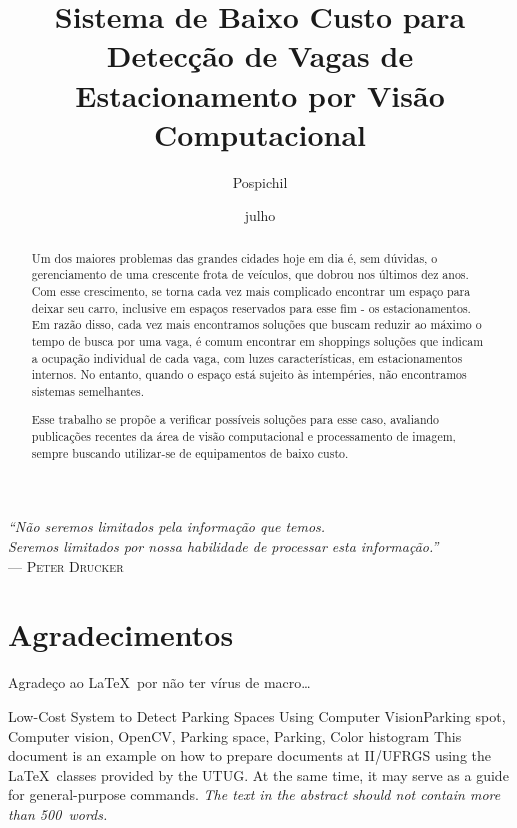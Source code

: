 \documentclass[ecp,tc]{iiufrgs}
\title{Sistema de Baixo Custo para Detecção de Vagas de Estacionamento por Visão Computacional}
\author{Pospichil}{Bruno Meybom}
\date{julho}{2015}
\begin{document}
\maketitle

\clearpage
\begin{flushright}
\mbox{}\vfill
{\sffamily\itshape
``Não seremos limitados pela informação que temos.\\
Seremos limitados por nossa habilidade de processar esta informação.''\\}
--- \textsc{Peter Drucker}
\end{flushright}

\chapter*{Agradecimentos}
Agradeço ao \LaTeX\ por não ter vírus de macro\ldots



\begin{abstract}
Um dos maiores problemas das grandes cidades hoje em dia é, sem dúvidas, o gerenciamento de uma crescente frota de veículos, que dobrou nos últimos dez anos. Com esse crescimento, se torna cada vez mais complicado encontrar um espaço para deixar seu carro, inclusive em espaços reservados para esse fim - os estacionamentos. Em razão disso, cada vez mais encontramos soluções que buscam reduzir ao máximo o tempo de busca por uma vaga, é comum encontrar em shoppings soluções que indicam a ocupação individual de cada vaga, com luzes características, em estacionamentos internos. No entanto, quando o espaço está sujeito às intempéries, não encontramos sistemas semelhantes.

Esse trabalho se propõe a verificar possíveis soluções para esse caso, avaliando publicações recentes da área de visão computacional e processamento de imagem, sempre buscando utilizar-se de equipamentos de baixo custo.
\end{abstract}

\begin{englishabstract}{Low-Cost System to Detect Parking Spaces Using Computer Vision}{Parking spot, Computer vision, OpenCV, Parking space, Parking, Color histogram}
This document is an example on how to prepare documents at II/UFRGS
using the \LaTeX\ classes provided by the UTUG\@. At the same time, it
may serve as a guide for general-purpose commands. \emph{The text in
the abstract should not contain more than 500~words.}
\end{englishabstract}
\end{document}

